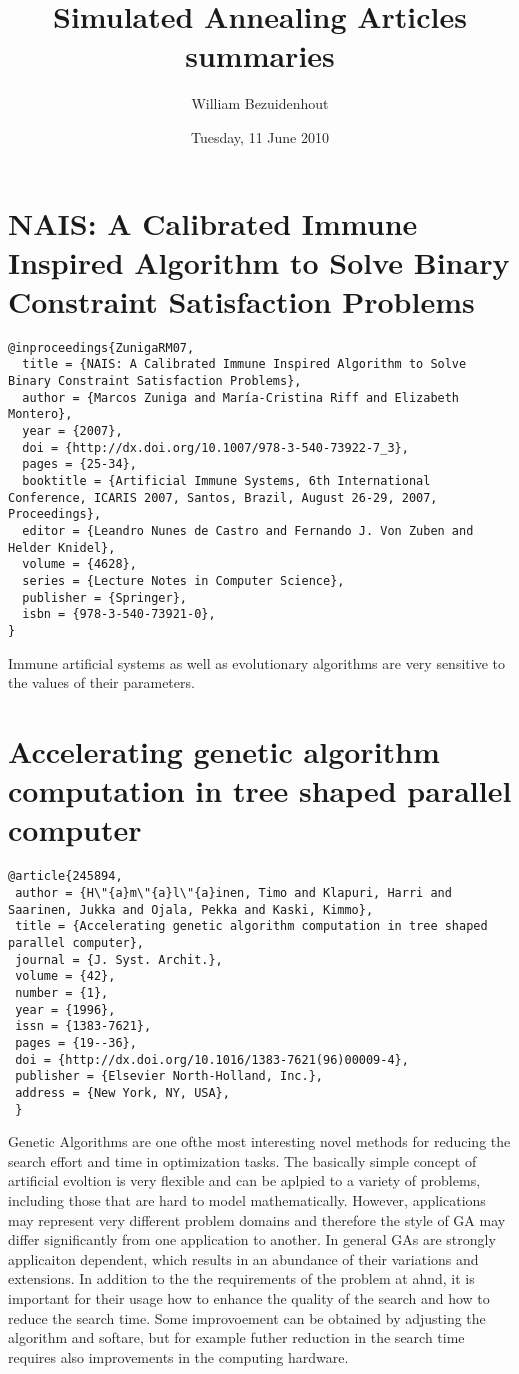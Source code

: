 \documentclass[pdftex,11pt]{article}
\title{Simulated Annealing Articles summaries}
\author{William Bezuidenhout}
\date{Tuesday, 11 June 2010}
\begin{document}
\maketitle
\section{NAIS: A Calibrated Immune Inspired Algorithm to Solve Binary Constraint Satisfaction Problems}
\begin{verbatim}
@inproceedings{ZunigaRM07,
  title = {NAIS: A Calibrated Immune Inspired Algorithm to Solve Binary Constraint Satisfaction Problems},
  author = {Marcos Zuniga and María-Cristina Riff and Elizabeth Montero},
  year = {2007},
  doi = {http://dx.doi.org/10.1007/978-3-540-73922-7_3},
  pages = {25-34},
  booktitle = {Artificial Immune Systems, 6th International Conference, ICARIS 2007, Santos, Brazil, August 26-29, 2007, Proceedings},
  editor = {Leandro Nunes de Castro and Fernando J. Von Zuben and Helder Knidel},
  volume = {4628},
  series = {Lecture Notes in Computer Science},
  publisher = {Springer},
  isbn = {978-3-540-73921-0},
}
\end{verbatim}
Immune artificial systems as well as evolutionary algorithms are very sensitive to the values of their parameters.

\section{Accelerating genetic algorithm computation in tree shaped parallel computer}
\begin{verbatim}
@article{245894,
 author = {H\"{a}m\"{a}l\"{a}inen, Timo and Klapuri, Harri and Saarinen, Jukka and Ojala, Pekka and Kaski, Kimmo},
 title = {Accelerating genetic algorithm computation in tree shaped parallel computer},
 journal = {J. Syst. Archit.},
 volume = {42},
 number = {1},
 year = {1996},
 issn = {1383-7621},
 pages = {19--36},
 doi = {http://dx.doi.org/10.1016/1383-7621(96)00009-4},
 publisher = {Elsevier North-Holland, Inc.},
 address = {New York, NY, USA},
 }
\end{verbatim}
Genetic Algorithms are one ofthe most interesting novel methods for reducing the search effort and time in optimization tasks. The basically simple concept of artificial evoltion is very flexible and can be aplpied to a variety of problems, including those that are hard to model mathematically. However, applications may represent very different problem domains and therefore the style of GA may differ significantly from one application to another. In general GAs are strongly applicaiton dependent, which results in an abundance of their variations and extensions. In addition to the the requirements of the problem at ahnd, it is important for their usage how to enhance the quality of the search and how to reduce the search time. Some improvoement can be obtained by adjusting the algorithm and softare, but for example futher reduction in the search time requires also improvements in the computing hardware.
\end{document}
